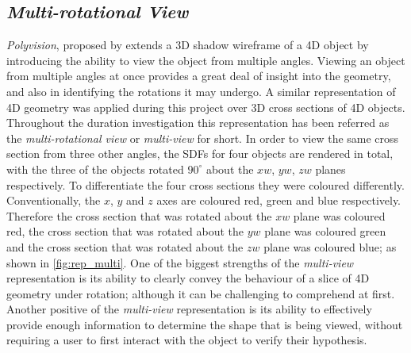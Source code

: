\documentclass{l4proj}
\begin{document}
\subsection{\textit{Multi-rotational View}}
\textit{Polyvision}, proposed by \citet{matsumoto_polyvision_2019} extends a 3D shadow wireframe of a 4D object by introducing the ability to view the object from multiple angles. Viewing an object from multiple angles at once provides a great deal of insight into the geometry, and also in identifying the rotations it may undergo.
A similar representation of 4D geometry was applied during this project over 3D cross sections of 4D objects. Throughout the duration investigation this representation has been referred as the \textit{multi-rotational view} or \textit{multi-view} for short.
In order to view the same cross section from three other angles, the SDFs for four objects are rendered in total, with the three of the objects rotated $90^{\circ}$ about the $xw$, $yw$, $zw$ planes respectively. 
To differentiate the four cross sections they were coloured differently. Conventionally, the \(x\), \(y\) and \(z\) axes are coloured red, green and blue respectively. Therefore the cross section that was rotated about the $xw$ plane was coloured red, the cross section that was rotated about the $yw$ plane was coloured green and the cross section that was rotated about the $zw$ plane was coloured blue; as shown in \cref{fig:rep_multi}.
One of the biggest strengths of the \textit{multi-view} representation is its ability to clearly convey the behaviour of a slice of 4D geometry under rotation; although it can be challenging to comprehend at first.
Another positive of the \textit{multi-view} representation is its ability to effectively provide enough information to determine the shape that is being viewed, without requiring a user to first interact with the object to verify their hypothesis.
\end{document}

